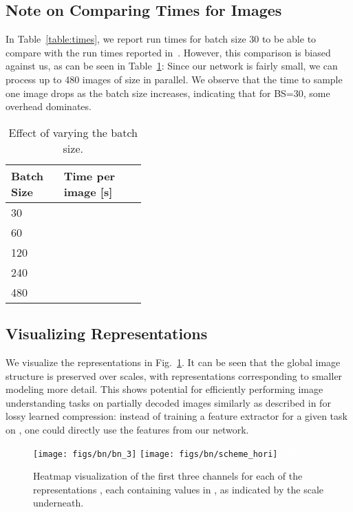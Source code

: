 \documentclass[10pt,twocolumn,letterpaper]{article}
\begin{document}
{\subsection{Note on Comparing Times for  Images} \label{sec:note_pcnn_cmp}
In Table~\ref{table:times}, we report run times for batch size 30 to be able to compare with the run times reported in~\cite{reed2017parallel}. However, this comparison is biased against us, as can be seen in Table~\ref{table:batchsize_32}: Since our network is fairly small, we can process up to 480 images of size  in parallel. We observe that the time to sample one image drops as the batch size increases, indicating that for BS=30, some overhead dominates.

\begin{table}[h!]
    \centering
    \begin{tabular}{p{0.39\linewidth}l}
        \toprule
        Batch Size & Time per image [s] \\
        \midrule
        30 &  \\
        60 &  \\
        120 &  \\
        240 &  \\
        480 &  \\
        \bottomrule
    \end{tabular}
    \captionsetup{width=.8\linewidth}
    \caption{\label{table:batchsize_32}Effect of varying the batch size.\hfill}
\end{table}



\clearpage


\subsection{Visualizing Representations} \label{sec:visualize_repr}

We visualize the representations  in Fig.~\ref{fig:bn}. It can be seen that the global image structure is preserved over scales, with representations corresponding to smaller  modeling more detail. This shows potential for efficiently performing image understanding tasks on partially decoded images similarly as described in \cite{torfason2018towards} for lossy learned compression: instead of training a feature extractor for a given task on , one could directly use the features  from our network.

\begin{figure}[ht]
\centering
    \texttt{[image: figs/bn/bn\_3]}\vspace{-0.9ex}
    \texttt{[image: figs/bn/scheme\_hori]}\vspace{-3.1ex}
    {\tiny \textcolor{white}{1\hfill25}}
    \caption{\label{fig:bn}Heatmap visualization of the first three channels for each of the representations , each containing values in , as indicated by the scale underneath.}
\end{figure}


}
\end{document}
